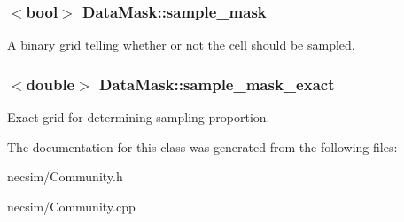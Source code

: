 \subsubsection[{\texorpdfstring{sample\+\_\+mask}{sample_mask}}]{$<$bool$>$ Data\+Mask\+::sample\+\_\+mask\hspace{0.3cm}{\ttfamily [inherited]}}\hypertarget{class_data_mask_a0ebe741d4b22824f93dacddd175d2c96}{}\label{class_data_mask_a0ebe741d4b22824f93dacddd175d2c96}
A binary grid telling whether or not the cell should be sampled. 
\subsubsection[{\texorpdfstring{sample\+\_\+mask\+\_\+exact}{sample_mask_exact}}]{$<$double$>$ Data\+Mask\+::sample\+\_\+mask\+\_\+exact\hspace{0.3cm}{\ttfamily [inherited]}}\hypertarget{class_data_mask_acc231ebddc3e5db0103220b20d968a4f}{}\label{class_data_mask_acc231ebddc3e5db0103220b20d968a4f}
Exact grid for determining sampling proportion. 

The documentation for this class was generated from the following files\+:\begin{DoxyCompactItemize}
\item 
necsim/Community.\+h\item 
necsim/Community.\+cpp\end{DoxyCompactItemize}

